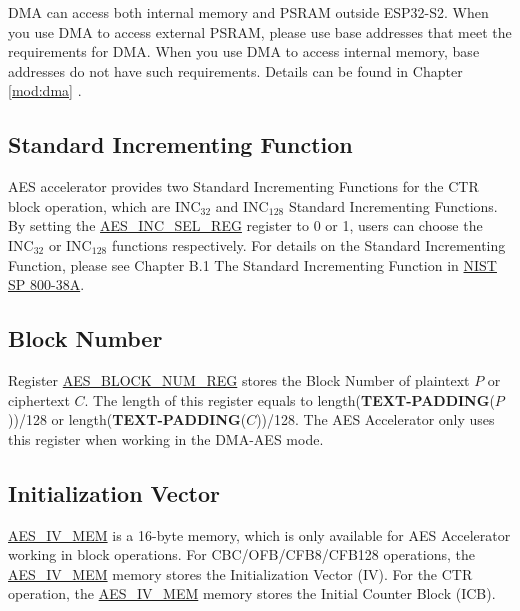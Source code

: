\documentclass[main\_\_EN.tex]{subfiles}
\begin{document}
DMA can access both internal memory and PSRAM outside ESP32-S2. When you use DMA to access external PSRAM, please use base addresses that meet the requirements for DMA. When you use DMA to access internal memory,  base addresses do not have such requirements. Details can be found in Chapter \ref{mod:dma} \textit{}.

\subsection{Standard Incrementing Function}\label{Label Label Standard Incrementing Function}

AES accelerator provides two Standard Incrementing Functions for the CTR block operation, which are INC$_{32}$ and INC$_{128}$ Standard Incrementing Functions. By setting the  \hyperref[regdesc:AESINCSELREG]{AES\_INC\_SEL\_REG} register to 0 or 1, users can choose the INC$_{32}$ or INC$_{128}$ functions respectively. For details on the Standard Incrementing Function, please see Chapter B.1 The Standard Incrementing Function in \href{https://nvlpubs.nist.gov/nistpubs/Legacy/SP/nistspecialpublication800-38a.pdf}{NIST SP 800-38A}.

\subsection{ Block Number}\label{Label Block Number}

Register \hyperref[regdesc:AESBLOCKNUMREG]{AES\_BLOCK\_NUM\_REG} stores the Block Number of plaintext $P$ or ciphertext $C$. The length of this register equals to length({\bfseries TEXT-PADDING}($P$))/128 or length({\bfseries TEXT-PADDING}($C$))/128. The AES Accelerator only uses this register when working in the DMA-AES mode.

\subsection{Initialization Vector}\label{Label IV}

\label{memdesc:AESIVMEM}\hyperref[memdesc:AESIVMEM]{AES\_IV\_MEM} is a 16-byte memory, which is only available for AES Accelerator working in block operations. For CBC/OFB/CFB8/CFB128 operations, the \hyperref[memdesc:AESIVMEM]{AES\_IV\_MEM} memory stores the Initialization Vector (IV). For the CTR operation, the \hyperref[memdesc:AESIVMEM]{AES\_IV\_MEM} memory stores the Initial Counter Block (ICB).
\end{document}
